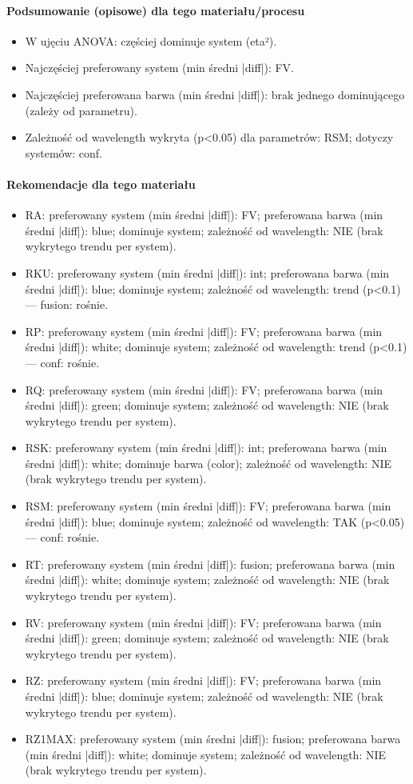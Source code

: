 \documentclass[
  10pt,
]{article}
\begin{document}
\paragraph{Podsumowanie (opisowe) dla tego materiału/procesu}
\begin{itemize}
\item W ujęciu ANOVA: częściej dominuje system (eta²).
\item Najczęściej preferowany system (min średni |diff|): FV.
\item Najczęściej preferowana barwa (min średni |diff|): brak jednego dominującego (zależy od parametru).
\item Zależność od wavelength wykryta (p<0.05) dla parametrów: RSM; dotyczy systemów: conf.
\end{itemize}
\paragraph{Rekomendacje dla tego materiału}
\begin{itemize}
\item RA: preferowany system (min średni |diff|): FV; preferowana barwa (min średni |diff|): blue; dominuje system; zależność od wavelength: NIE (brak wykrytego trendu per system).
\item RKU: preferowany system (min średni |diff|): int; preferowana barwa (min średni |diff|): blue; dominuje system; zależność od wavelength: trend (p<0.1) — fusion: rośnie.
\item RP: preferowany system (min średni |diff|): FV; preferowana barwa (min średni |diff|): white; dominuje system; zależność od wavelength: trend (p<0.1) — conf: rośnie.
\item RQ: preferowany system (min średni |diff|): FV; preferowana barwa (min średni |diff|): green; dominuje system; zależność od wavelength: NIE (brak wykrytego trendu per system).
\item RSK: preferowany system (min średni |diff|): int; preferowana barwa (min średni |diff|): white; dominuje barwa (color); zależność od wavelength: NIE (brak wykrytego trendu per system).
\item RSM: preferowany system (min średni |diff|): FV; preferowana barwa (min średni |diff|): blue; dominuje system; zależność od wavelength: TAK (p<0.05) — conf: rośnie.
\item RT: preferowany system (min średni |diff|): fusion; preferowana barwa (min średni |diff|): white; dominuje system; zależność od wavelength: NIE (brak wykrytego trendu per system).
\item RV: preferowany system (min średni |diff|): FV; preferowana barwa (min średni |diff|): green; dominuje system; zależność od wavelength: NIE (brak wykrytego trendu per system).
\item RZ: preferowany system (min średni |diff|): FV; preferowana barwa (min średni |diff|): blue; dominuje system; zależność od wavelength: NIE (brak wykrytego trendu per system).
\item RZ1MAX: preferowany system (min średni |diff|): fusion; preferowana barwa (min średni |diff|): white; dominuje system; zależność od wavelength: NIE (brak wykrytego trendu per system).
\end{itemize}
\end{document}
